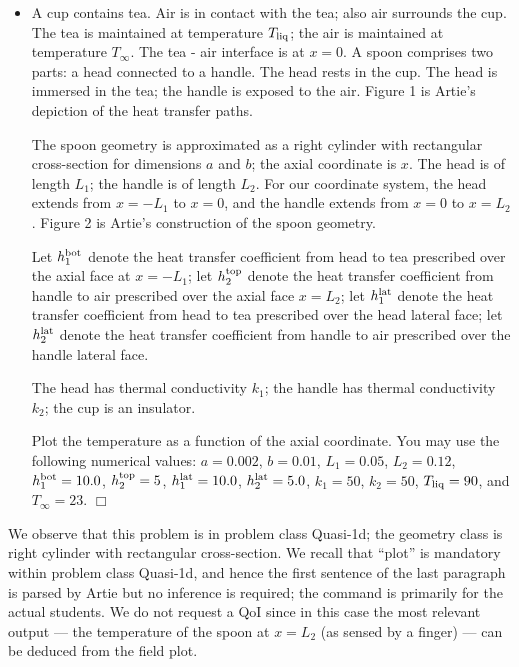\documentclass[preprint,12pt]{article}
\begin{document}
\begin{itemize}
\item[]
A cup contains tea. Air is in contact with the tea; also air surrounds the cup. The tea is maintained at temperature $T_{\rm liq}$; the air is maintained at temperature $T_{\infty}$. The tea - air interface is at $ x = 0 $. A spoon comprises two parts: a head connected to a handle. The head rests in the cup. The head is immersed in the tea; the handle is exposed to the air. Figure 1 is Artie's depiction of the heat transfer paths.

The spoon geometry is approximated as a right cylinder with rectangular cross-section for dimensions $a$ and $b$; the axial coordinate is $x$. The head is of length $L_1$; the handle is of length $L_2$. For our coordinate system, the head extends from $ x = - L_1 $ to $ x = 0 $, and the handle extends from $ x = 0 $ to $ x = L_2 $. Figure 2 is Artie's construction of the spoon geometry.


Let $h_1^{\rm bot}$ denote the heat transfer coefficient from head to tea prescribed over the axial face at $ x = - L_1$; let $h_2^{\rm top}$ denote the heat transfer coefficient from handle to air prescribed over the axial face $x = L_2$; let $h_1^{\rm lat}$ denote the heat transfer coefficient from head to tea prescribed over the head lateral face; let $h_2^{\rm lat}$ denote the heat transfer coefficient from handle to air prescribed over the handle lateral face.

The head has thermal conductivity $k_1$; the handle has thermal conductivity $k_2$; the cup is an insulator.

Plot the temperature as a function of the axial coordinate. You may use the following numerical values: $ a = 0.002$, $b = 0.01 $, $ L_1 =  0.05 $, $L_2 = 0.12$, $h_1^{\rm bot} = 10.0$, $h_2^{\rm top} = 5$, $h_1^{\rm lat} = 10.0$, $h_2^{\rm lat} = 5.0$, $ k_1 = 50 $, $ k_2 = 50$, $T_{\rm liq} = 90$, and $T_\infty = 23$. $\Box$
\end{itemize}
We observe that this problem is in problem class Quasi-1d; the geometry class is right cylinder with rectangular cross-section. We recall that ``plot'' is mandatory within problem class Quasi-1d, and hence the first sentence of the last paragraph is parsed by Artie but no inference is required; the command is primarily for the actual students. We do not request a QoI since in this case the most relevant output --- the temperature of the spoon at $x = L_2$ (as sensed by a finger) --- can be deduced from the field plot.
\end{document}
